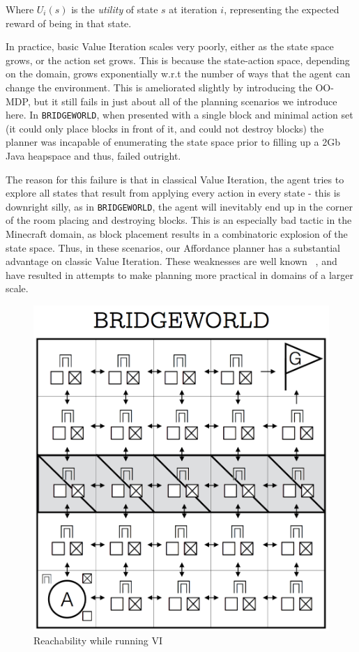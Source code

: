 \documentclass[]{article}
\begin{document}
Where $U_i(s)$ is the {\it utility} of state $s$ at iteration $i$, representing the expected reward of being in that state.

In practice, basic Value Iteration scales very poorly, either as the state space grows, or the action set grows. This is because the state-action space, depending on the domain, grows exponentially w.r.t the number of ways that the agent can change the environment. This is ameliorated slightly by introducing the OO-MDP, but it still fails in just about all of the planning scenarios we introduce here. In \texttt{BRIDGEWORLD}, when presented with a single block and minimal action set (it could only place blocks in front of it, and could not destroy blocks) the planner was incapable of enumerating the state space prior to filling up a 2Gb Java heapspace and thus, failed outright.

The reason for this failure is that in classical Value Iteration, the agent tries to explore all states that result from applying every action in every state - this is downright silly, as in \texttt{BRIDGEWORLD}, the agent will inevitably end up in the corner of the room placing and destroying blocks. This is an especially bad tactic in the Minecraft domain, as block placement results in a combinatoric explosion of the state space. Thus, in these scenarios, our Affordance planner has a substantial advantage on classic Value Iteration. These weaknesses are well known ~\citep{grounds05}, and have resulted in attempts to make planning more practical in domains of a larger scale.


\begin{figure}
\centering
\includegraphics[scale = 0.2]{figures/bridgeworld_vi.png}
\caption{Reachability while running VI}
\end{figure}
\end{document}

